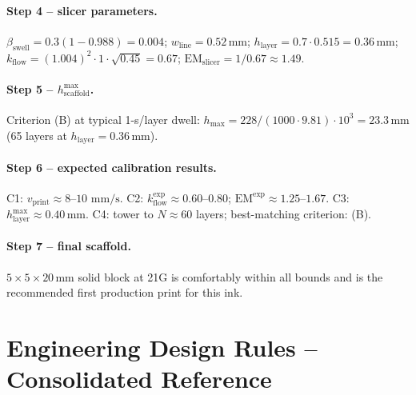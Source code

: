 \documentclass[11pt,a4paper]{article}
\newcommand{\mms}{\,\mathrm{mm/s}}
\begin{document}
\paragraph{Step 4 -- slicer parameters.}
$\beta_\mathrm{swell}=0.3(1-0.988)=0.004$;
$w_\mathrm{line}=0.52\,\si{\mm}$;
$h_\mathrm{layer}=0.7\cdot 0.515=0.36\,\si{\mm}$;
$k_\mathrm{flow}=(1.004)^2\cdot 1\cdot\sqrt{0.45}=0.67$;
\textbf{$\mathrm{EM}_\mathrm{slicer}=1/0.67\approx 1.49$}.

\paragraph{Step 5 -- $h_\mathrm{scaffold}^{\max}$.}
Criterion (B) at typical 1-\si{\s}/layer dwell:
$h_\mathrm{max}=228/(1000\cdot 9.81)\cdot 10^3=23.3\,\si{\mm}$
(65 layers at $h_\mathrm{layer}=0.36\,\si{\mm}$).

\paragraph{Step 6 -- expected calibration results.}
C1: $v_\mathrm{print}\approx 8$--$10\,\mms$. C2:
$k_\mathrm{flow}^\mathrm{exp}\approx 0.60$--$0.80$;
$\mathrm{EM}^\mathrm{exp}\approx 1.25$--$1.67$. C3:
$h_\mathrm{layer}^{\max}\approx 0.40\,\si{\mm}$. C4: tower to
$N\approx 60$ layers; best-matching criterion: (B).

\paragraph{Step 7 -- final scaffold.}
$5\times 5\times 20\,\si{\mm}$ solid block at 21G is comfortably within
all bounds and is the recommended first production print for this ink.

\section{Engineering Design Rules -- Consolidated Reference}
\label{app:design_rules}
\end{document}
